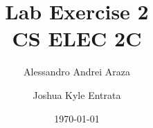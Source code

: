 

\title{{\Huge Lab Exercise 2}\\{\small CS ELEC 2C}}
\author{Alessandro Andrei Araza \and Joshua Kyle Entrata}
\date{\today}



    \maketitle

    \begin{abstract}
        \blindtext[1]

        \vspace{0.5\baselineskip}
        \noindent
    \end{abstract}

    \begin{multicols}{2}
        
        
        
        
        
    \end{multicols}





